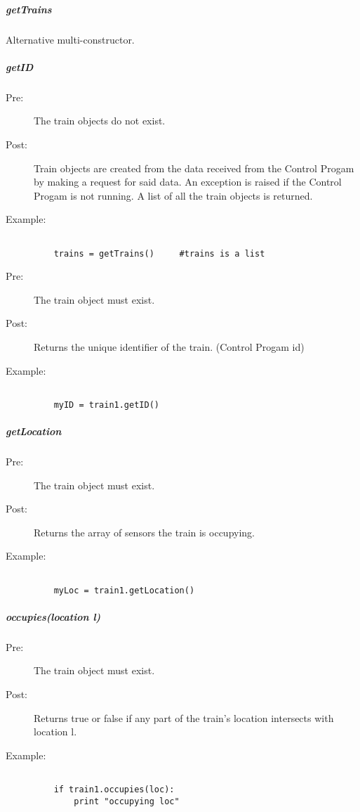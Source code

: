 \documentclass[a4paper,11pt,notitlepage]{article}
\def\CS{Control Progam\xspace} \def\LC{Local Copy of Train State\xspace} \def\TN{Track Node\xspace}
\begin{document}
\subparagraph{getTrains} Alternative multi-constructor. 
\subparagraph{getID}
\begin{description}
\item[\hspace{1cm}Pre:] The train objects do not exist. 
\item[\hspace{1cm}Post:] Train objects are created from the data received from the \CS by making a request for said data. An exception is raised if the \CS is not running. A list of all the train objects is returned.
\item[\hspace{1cm}Example:]
\begin{verbatim}

    trains = getTrains()     #trains is a list
\end{verbatim}
\end{description}

\begin{description}
\item[\hspace{1cm}Pre:] The train object must exist. 
\item[\hspace{1cm}Post:] Returns the unique identifier of the train. (\CS id)
\item[\hspace{1cm}Example:]
\begin{verbatim}

    myID = train1.getID()
\end{verbatim}
\end{description}

\subparagraph{getLocation} 
\begin{description}
\item[\hspace{1cm}Pre:] The train object must exist. 
\item[\hspace{1cm}Post:] Returns the array of sensors the train is occupying.
\item[\hspace{1cm}Example:]
\begin{verbatim}

    myLoc = train1.getLocation()
\end{verbatim}
\end{description}


\subparagraph{occupies(location l)} 
\begin{description}
\item[\hspace{1cm}Pre:] The train object must exist. 
\item[\hspace{1cm}Post:] Returns true or false if any part of the train's location intersects with location l.
\item[\hspace{1cm}Example:]
\begin{verbatim}

    if train1.occupies(loc):
        print "occupying loc"
\end{verbatim}
\end{description}
\end{document}
